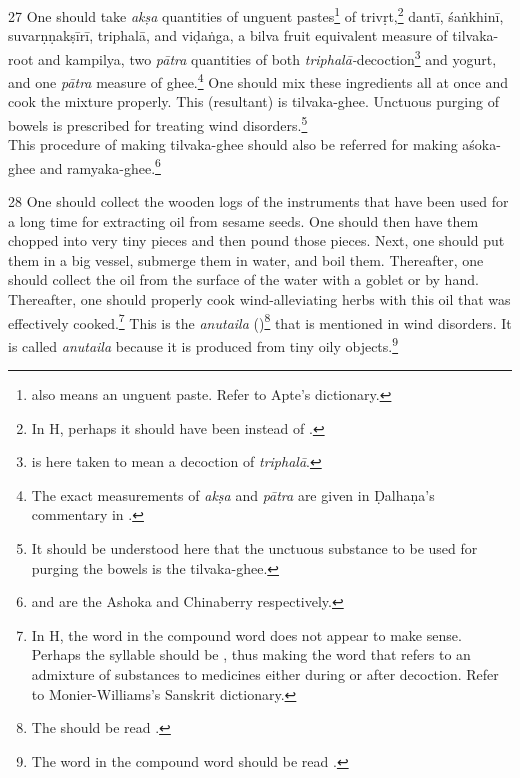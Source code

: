 \begin{translation}
    \item[27]
    One should take \textit{akṣa} quantities of unguent 
    pastes\footnote{ also means an unguent paste. Refer to Apte's 
    dictionary.} of \gls{trivṛt},\footnote{In H, perhaps it should have been 
     instead of .} \gls{dantī}, \gls{śaṅkhinī}, 
    \gls{suvarṇṇakṣīrī}, \gls{triphalā}, and \gls{viḍaṅga}, a \gls{bilva} fruit 
    equivalent measure of \gls{tilvaka}-root and \gls{kampilya}, two 
    \textit{pātra} quantities of both 
    \textit{triphalā-}decoction\footnote{ is here taken to mean 
    a decoction of \textit{triphalā}.} and yogurt, and one \textit{pātra} measure 
    of ghee.\footnote{The exact measurements of \textit{akṣa} and \textit{pātra} 
    are given in Ḍalhaṇa's commentary in \cite[422]{vulgate}.} One should mix 
    these ingredients all at once and cook the mixture properly. This (resultant) is 
    \gls{tilvaka}-ghee. Unctuous purging of bowels is prescribed for treating wind 
    disorders.\footnote{It should be understood here that the unctuous substance 
    to be used for purging the bowels is the \gls{tilvaka}-ghee.}\\
    This procedure of making \gls{tilvaka}-ghee should also be referred for making \gls{aśoka}-ghee and \gls{ramyaka}-ghee.\footnote{ and  are the Ashoka and Chinaberry respectively.}

    \item[28]
    One should collect the wooden logs of the instruments that have been used for a long time for extracting oil from sesame seeds. One should then have them chopped into very tiny pieces and then pound those pieces. Next, one should put them in a big vessel, submerge them in water, and boil them. Thereafter, one should collect the oil from the surface of the water with a goblet or by hand. Thereafter, one should properly cook wind-alleviating herbs with this oil that was effectively cooked.\footnote{In H, the word  in the compound word  does not appear to make sense. Perhaps the syllable  should be , thus making the word  that refers to an admixture of substances to medicines either during or after decoction. Refer to Monier-Williams's Sanskrit dictionary.} This is the \textit{anutaila} ()\footnote{The  should be read .} that is mentioned in wind disorders. It is called \textit{anutaila} because it is produced from tiny oily objects.\footnote{The word  in the compound word  should be read .} 


\end{translation}
